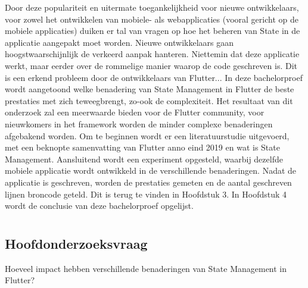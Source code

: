 Door deze populariteit en uitermate toegankelijkheid voor nieuwe ontwikkelaars, voor zowel het ontwikkelen van mobiele- als webapplicaties (vooral gericht op de mobiele applicaties) duiken er tal van vragen op hoe het beheren van State in de applicatie aangepakt moet worden. Nieuwe ontwikkelaars gaan hoogstwaarschijnlijk de verkeerd aanpak hanteren. Niettemin dat deze applicatie werkt, maar eerder over de rommelige manier waarop de code geschreven is.
Dit is een erkend probleem door de ontwikkelaars van Flutter...
\newline
In deze bachelorproef wordt aangetoond welke benadering van State Management in Flutter de beste prestaties met zich teweegbrengt, zo-ook de complexiteit. Het resultaat van dit onderzoek zal een meerwaarde bieden voor de Flutter community, voor nieuwkomers in het framework worden de minder complexe benaderingen afgebakend worden. Om te beginnen wordt er een literatuurstudie uitgevoerd, met een beknopte samenvatting van Flutter anno eind 2019 en wat is State Management. Aansluitend wordt een experiment opgesteld, waarbij dezelfde mobiele applicatie wordt ontwikkeld in de verschillende benaderingen. Nadat de applicatie is geschreven, worden de prestaties gemeten en de aantal geschreven lijnen broncode geteld. Dit is terug te vinden in Hoofdstuk 3. In Hoofdstuk 4 wordt de conclusie van deze bachelorproef opgelijst.

\section{}
\label{sec:onderzoeksvraag}

\subsection{Hoofdonderzoeksvraag}
Hoeveel impact hebben verschillende benaderingen van State Management in Flutter?

